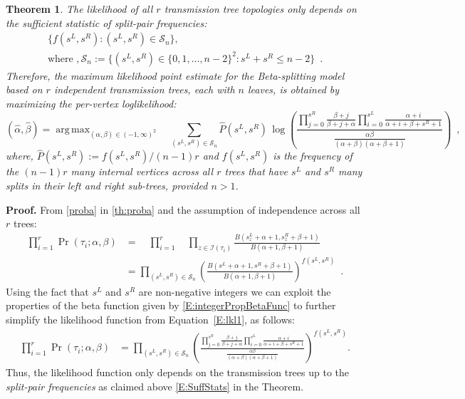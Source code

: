 \documentclass[review]{elsarticle}
\numberwithin{equation}{section}
\let\orgautoref\autoref
\renewcommand{\autoref}
        {\def\equationautorefname{Eq.}%
         \def\figureautorefname{Fig.}%
         \def\subfigureautorefname{Fig.}%
         \def\sectionautorefname{Sect.}%
         \def\subsectionautorefname{Sect.}%
         \def\subsubsectionautorefname{Sect.}%
         \def\Itemautorefname{item}%
         \def\tableautorefname{Table}%
         \def\propositionautorefname{Prop.}%
         \def\corollaryautorefname{Corollary}%
         \def\theoremautorefname{Theorem}%
         \def\remarkautorefname{Remark}%
         \def\lemmaautorefname{Lemma}%
         \def\proofofautorefname{Proof}%
         \def\exampleautorefname{Example}%
         \orgautoref}
\DeclareMathOperator*{\argmax}{arg\,max}
\newtheorem{theorem}{Theorem}%
\begin{document}
\begin{theorem}\label{th:suff}
The likelihood of all $r$ transmission tree topologies only depends on the sufficient statistic of {\em split-pair frequencies}: 
\begin{multline}\label{E:SuffStats}
\{f(s^L,s^R): (s^L,s^R) \in \mathcal{S}_n \}, \quad \\ \text{where }, \mathcal{S}_n := \{(s^L,s^R) \in \{0,1,\ldots,n-2\}^2 : s^L+s^R \leq n-2\} \enspace.
\end{multline}
Therefore, the maximum likelihood point estimate for the Beta-splitting model based on $r$ independent transmission trees, each with $n$ leaves, is obtained by maximizing the per-vertex loglikelihood:
\begin{equation}\label{E:perNodeMLE}
(\widehat{\alpha},\widehat{\beta}) = \argmax_{(\alpha,\beta) \in (-1,\infty)^2} \quad 
\sum_{(s^L,s^R) \in \mathcal{S}_n} {\hat{P}(s^L,s^R)} \, \log\left(\frac{\prod_{j=0}^{s^R}\frac{\beta+j}{\beta+j+\alpha} \prod_{i=0}^{s^L} \frac{\alpha+i}{\alpha+i+\beta+s^R+1}}
{\frac{\alpha \beta}{(\alpha+\beta)(\alpha+\beta+1)}}\right) \enspace,
\end{equation}
where, $\hat{P}(s^L,s^R):=f(s^L,s^R)/(n-1)r$ and 
$f(s^L,s^R)$ is the frequency of the $(n-1)r$ many internal vertices across all $r$ trees that have $s^L$ and $s^R$ many splits in their left and right sub-trees, provided $n>1$.
\end{theorem}

\smallskip
\noindent\textbf{Proof.} 
From \autoref{proba} in \autoref{th:proba} and the assumption of independence across all $r$ trees:
\begin{align}
\prod_{i=1}^r \Pr(\tau_i; \alpha, \beta)  
&= \quad \prod_{i=1}^r \quad \prod_{z \in \mathcal{I}(\tau_i)}\frac{B(s_z^L+\alpha+1,s_z^R+\beta+1)}{B(\alpha+1,\beta+1)} \label{E:lkl0}\\
&= \prod_{(s^L,s^R) \in \mathcal{S}_n} \left( \frac{B(s^L+\alpha+1,s^R+\beta+1)}{B(\alpha+1,\beta+1)} \right)^{f(s^L,s^R)}\enspace. \label{E:lkl1}
\end{align}
Using the fact that $s^L$ and $s^R$ are non-negative integers we can exploit the properties of the beta function given by \autoref{E:integerPropBetaFunc} to further simplify the likelihood function from Equation~\ref{E:lkl1}, as follows:
\begin{align}\label{E:lkl2}
\prod_{i=1}^r \Pr(\tau_i; \alpha, \beta) 
&=
\prod_{(s^L,s^R) \in \mathcal{S}_n} \left(\frac{\prod_{j=0}^{s^R}\frac{\beta+j}{\beta+j+\alpha} \prod_{i=0}^{s^L} \frac{\alpha+i}{\alpha+i+\beta+s^R+1}}
{\frac{\alpha \beta}{(\alpha+\beta)(\alpha+\beta+1)}}\right)^{f(s^L,s^R)}.
\end{align}
Thus, the likelihood function only depends on the transmission trees up to the {\em split-pair frequencies} as claimed above \autoref{E:SuffStats} in the Theorem.
\end{document}
